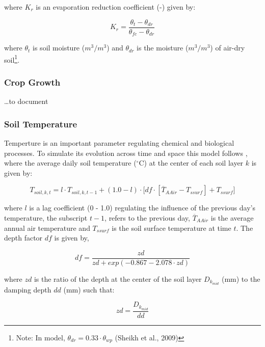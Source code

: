 \documentclass[]{article}
\let\rmarkdownfootnote\footnote%
\def\footnote{\protect\rmarkdownfootnote}
\begin{document}
where \(K_r\) is an evaporation reduction coefficient (-) given by:

\begin{equation}
K_r = \frac{ \theta_t - \theta_{dr} }{ \theta_{fc} - \theta_{dr} }
\label{eq:Kr}  
\end{equation}

where \(\theta_t\) is soil moisture (\(m^3/m^3\)) and \(\theta_{dr}\) is
the moisture (\(m^3/m^3\)) of air-dry
soil\footnote{Note: In model, $\theta_{dr} = 0.33 \cdot \theta_{wp}$ (Sheikh et al., 2009)}.

\subsubsection{Crop Growth}\label{crop-growth}

\ldots{}to document

\subsubsection{Soil Temperature}\label{soil-temperature}

Temperture is an important parameter regulating chemical and biological
processes. To simulate its evolution across time and space this model
follows \citep{Neitsch2009}, where the average daily soil temperature
(\(^{\circ}\)C) at the center of each soil layer \(k\) is given by:

\begin{equation}
T_{soil, k, t} = l \cdot T_{soil, k, t-1} + (1.0 - l) \cdot \big[df \cdot [\overline{T}_{AAir} - T_{ssurf}]+T_{ssurf}]
\label{eq:tempSoil} 
\end{equation}

where \(l\) is a lag coefficient (0 - 1.0) regulating the influence of
the previous day's temperature, the subscript \(t-1\), refers to the
previous day, \(\overline{T}_{AAir}\) is the average annual air
temperature and \(T_{ssurf}\) is the soil surface temperature at time
\(t\). The depth factor \(df\) is given by,

\begin{equation}
df = \frac{zd}{zd+exp(-0.867-2.078 \cdot zd)}
\label{eq:df} 
\end{equation}

where \(zd\) is the ratio of the depth at the center of the soil layer
\(D_{k_{mid}}\) (mm) to the damping depth \(dd\) (mm) such that:

\begin{equation}
zd = \frac{D_{k_{mid}}}{dd}
\label{eq:zd} 
\end{equation}
\end{document}
